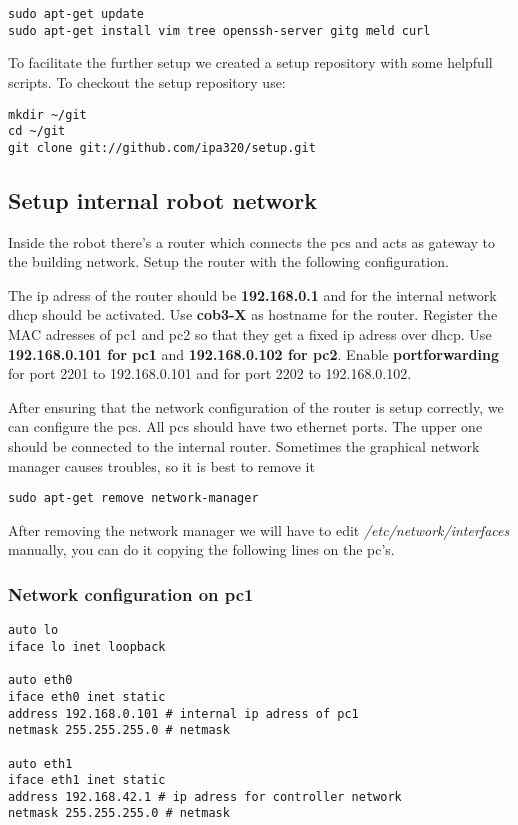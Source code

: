 \begin{lstlisting}
sudo apt-get update
sudo apt-get install vim tree openssh-server gitg meld curl
\end{lstlisting}

To facilitate the further setup we created a setup repository with some helpfull scripts. To checkout the setup repository use:

\begin{lstlisting}
mkdir ~/git
cd ~/git
git clone git://github.com/ipa320/setup.git
\end{lstlisting}

\subsection{Setup internal robot network}
Inside the robot there's a router which connects the pcs and acts as gateway to the building network. Setup the router with the following configuration. 

The ip adress of the router should be \textbf{192.168.0.1} and for the internal network dhcp should be activated. Use \textbf{cob3-X} as hostname for the router. Register the MAC adresses of pc1 and pc2 so that they get a fixed ip adress over dhcp. Use \textbf{192.168.0.101 for pc1} and \textbf{192.168.0.102 for pc2}. Enable \textbf{portforwarding} for port 2201 to 192.168.0.101 and for port 2202 to 192.168.0.102.

After ensuring that the network configuration of the router is setup correctly, we can configure the pcs. All pcs should have two ethernet ports. The upper one should be connected to the internal router. Sometimes the graphical network manager causes troubles, so it is best to remove it

\begin{lstlisting}
sudo apt-get remove network-manager
\end{lstlisting}

After removing the network manager we will have to edit \textit{/etc/network/interfaces} manually,  you can do it copying the following lines on the pc's.

\subsubsection{Network configuration on pc1}

\begin{lstlisting}
auto lo
iface lo inet loopback

auto eth0
iface eth0 inet static
address 192.168.0.101 # internal ip adress of pc1
netmask 255.255.255.0 # netmask

auto eth1
iface eth1 inet static
address 192.168.42.1 # ip adress for controller network
netmask 255.255.255.0 # netmask
\end{lstlisting}

